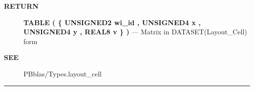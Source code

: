 \par
\begin{description}
\item [\colorbox{tagtype}{\color{white} \textbf{\textsf{RETURN}}}] \textbf{TABLE ( \{ UNSIGNED2 wi\_id , UNSIGNED4 x , UNSIGNED4 y , REAL8 v \} )} --- Matrix in DATASET(Layout\_Cell) form
\end{description}







\par
\begin{description}
\item [\colorbox{tagtype}{\color{white} \textbf{\textsf{SEE}}}] PBblas/Types.layout\_cell
\end{description}



\rule{\linewidth}{0.5pt}
